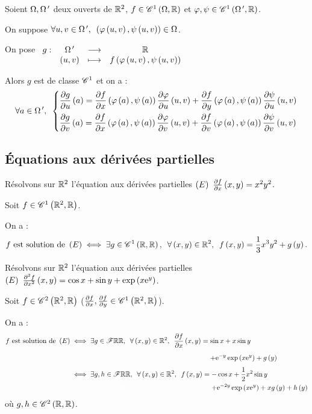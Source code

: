 \begin{cor}
Soient \(\Omega,\Omega^{\,\prime}\) deux ouverts de \(\mathbb{R}^2\), \(f\in\mathscr{C}^{1}\left(\Omega,\mathbb{R}\right)\) et \(\varphi,\psi\in\mathscr{C}^{1}\left(\Omega^{\,\prime},\mathbb{R}\right)\).

On suppose \(\quantifs{\forall u,v\in\Omega\prim}\paren{\phi\paren{u,v},\psi\paren{u,v}}\in\Omega\).

On pose \(\begin{array}[t]{cccc}g : & \Omega^{\,\prime} & \longrightarrow & \mathbb{R} \\ & \left(u,v\right) & \longmapsto & f\left(\varphi\left(u,v\right),\psi\left(u,v\right)\right)\end{array}\)

Alors \(g\) est de classe \(\mathscr{C}^{1}\) et on a : \[\quantifs{\forall a\in\Omega\prim}\begin{dcases}
\pdv{g}{u}\paren{a}=\pdv{f}{x}\paren{\phi\paren{a},\psi\paren{a}}\pdv{\phi}{u}\paren{u,v}+\pdv{f}{y}\paren{\phi\paren{a},\psi\paren{a}}\pdv{\psi}{u}\paren{u,v} \\
\pdv{g}{v}\paren{a}=\pdv{f}{x}\paren{\phi\paren{a},\psi\paren{a}}\pdv{\phi}{v}\paren{u,v}+\pdv{f}{v}\paren{\phi\paren{a},\psi\paren{a}}\pdv{\psi}{v}\paren{u,v}
\end{dcases}\]
\end{cor}

\subsection{Équations aux dérivées partielles}

\begin{ex}
Résolvons sur \(\mathbb{R}^2\) l'équation aux dérivées partielles \(\left(E\right)~\pdv{f}{x}\left(x,y\right)=x^2y^2\).

Soit \(f\in\mathscr{C}^{1}\left(\mathbb{R}^2,\mathbb{R}\right)\).

On a : \[f\text{ est solution de }\paren{E}\ssi\quantifs{\exists g\in\ensclasse{1}{\R}{\R};\forall\paren{x,y}\in\R^2}f\paren{x,y}=\dfrac{1}{3}x^3y^2+g\paren{y}.\]
\end{ex}

\begin{ex}
Résolvons sur \(\mathbb{R}^2\) l'équation aux dérivées partielles \(\left(E\right)~\pdv[order=2]{f}{x}\left(x,y\right)=\cos x+\sin y+\exp\left(x\mathrm{e}^{y}\right)\).

Soit \(f\in\mathscr{C}^{2}\left(\mathbb{R}^2,\mathbb{R}\right)\) (\cad \(\pdv{f}{x},\pdv{f}{y}\in\mathscr{C}^{1}\left(\mathbb{R}^2,\mathbb{R}\right)\)).

On a : \[\begin{aligned}
f\text{ est solution de }\paren{E}&\ssi\quantifs{\exists g\in\F{\R}{\R};\forall\paren{x,y}\in\R^2}\pdv{f}{x}\paren{x,y}=\sin x+x\sin y \\
&\color{white}\ssi\quantifs{\exists g\in\F{\R}{\R};\forall\paren{x,y}\in\R^2}\pdv{f}{x}\paren{x,y}=\color{black}+\e{-y}\exp\paren{x\e{y}}+g\paren{y} \\
&\ssi\quantifs{\exists g,h\in\F{\R}{\R};\forall\paren{x,y}\in\R^2}f\paren{x,y}=-\cos x+\dfrac{1}{2}x^2\sin y \\
&\color{white}\ssi\quantifs{\exists g,h\in\F{\R}{\R};\forall\paren{x,y}\in\R^2}f\paren{x,y}=\color{black}+\e{-2y}\exp\paren{x\e{y}}+xg\paren{y}+h\paren{y}
\end{aligned}\] où \(g,h\in\mathscr{C}^{2}\left(\mathbb{R},\mathbb{R}\right)\).
\end{ex}

